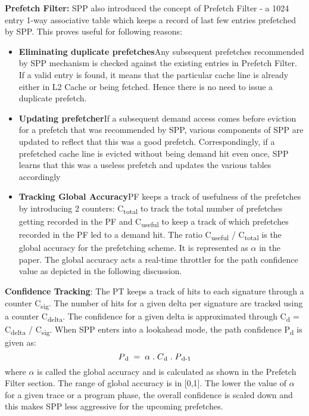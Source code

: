 \textbf{Prefetch Filter:} SPP also introduced the concept of Prefetch
Filter - a 1024 entry 1-way associative table which keeps a record of
last few entries prefetched by SPP.  This proves useful for following
reasons:
\begin{itemize}
\item \textbf{Eliminating duplicate prefetches}\newline Any subsequent
  prefetches recommended by SPP mechanism is checked against the
  existing entries in Prefetch Filter.  If a valid entry is found, it
  means that the particular cache line is already either in L2 Cache
  or being fetched.  Hence there is no need to issue a duplicate
  prefetch.
    
\item \textbf{Updating prefetcher}\newline If a subsequent demand
  access comes before eviction for a prefetch that was recommended by
  SPP, various components of SPP are updated to reflect that this was
  a good prefetch.  Correspondingly, if a prefetched cache line is
  evicted without being demand hit even once, SPP learns that this was
  a useless prefetch and updates the various tables accordingly
    
\item \textbf{Tracking Global Accuracy}\newline PF keeps a track of
  usefulness of the prefetches by introducing 2 counters:
  C\textsubscript{total} to track the total number of prefetches
  getting recorded in the PF and C\textsubscript{useful} to keep a
  track of which prefetches recorded in the PF led to a demand hit.
  The ratio C\textsubscript{useful} / C\textsubscript{total} is the
  global accuracy for the prefetching scheme.  It is represented as
  $\alpha$ in the paper.  The global accuracy acts a real-time
  throttler for the path confidence value as depicted in the following
  discussion.  \newline
\end{itemize}
\textbf{Confidence Tracking}: The PT keeps a track of hits to each
signature through a counter C\textsubscript{sig}.  The number of hits
for a given delta per signature are tracked using a counter
C\textsubscript{delta}.  The confidence for a given delta is
approximated through C\textsubscript{d} = C\textsubscript{delta} /
C\textsubscript{sig}.  When SPP enters into a lookahead mode, the path
confidence P\textsubscript{d} is given as:
$$P\textsubscript{d} \;=\; \alpha  \;.\;  C\textsubscript{d}  \;.\;  P\textsubscript{d-1}$$ where $\alpha$ is called the global accuracy and is calculated as shown in the Prefetch Filter section. 
The range of global accuracy is in [0,1].  The lower the value of
$\alpha$ for a given trace or a program phase, the overall confidence
is scaled down and this makes SPP less aggressive for the upcoming
prefetches.

